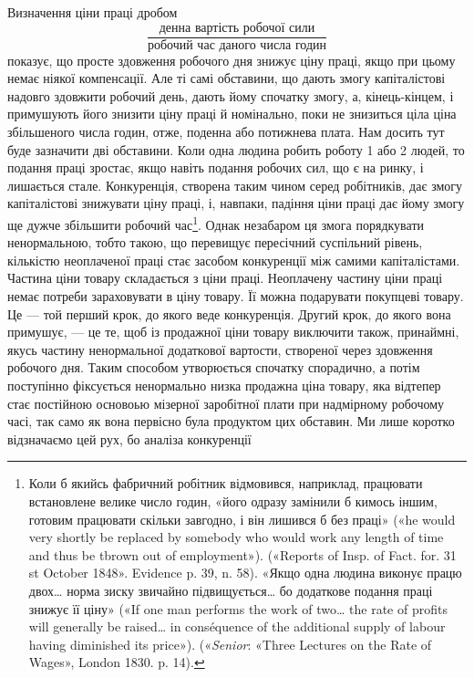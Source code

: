 Визначення ціни праці дробом\[
\frac{\text{денна вартість робочої сили}}{\text{робочий час даного числа годин}}
\]
\noindent{}показує, що просте здовження робочого дня знижує ціну праці,
якщо при цьому немає ніякої компенсації. Але ті самі обставини,
що дають змогу капіталістові надовго здовжити робочий день,
дають йому спочатку змогу, а, кінець-кінцем, і примушують
його знизити ціну праці й номінально, поки не знизиться ціла ціна
збільшеного числа годин, отже, поденна або потижнева плата.
Нам досить тут буде зазначити дві обставини. Коли одна людина
робить роботу 1 або 2 людей, то подання праці зростає, якщо
навіть подання робочих сил, що є на ринку, і лишається стале.
Конкуренція, створена таким чином серед робітників, дає змогу
капіталістові знижувати ціну праці, і, навпаки, падіння ціни
праці дає йому змогу ще дужче збільшити робочий час\footnote{
Коли б якийсь фабричний робітник відмовився, наприклад, працювати
встановлене велике число годин, «його одразу замінили б кимось
іншим, готовим працювати скільки завгодно, і він лишився б без праці»
(«he would very shortly be replaced by somebody who would work any
length of time and thus be tbrown out of employment»). («Reports of Insp.
of Fact. for. 31 st October 1848». Evidence p. 39, n. 58). «Якщо одна людина
виконує працю двох\dots{} норма зиску звичайно підвищується\dots{} бо додаткове
подання праці знижує її ціну» («If one man performs the work of
two\dots{} the rate of profits will generally be raised\dots{} in conséquence of the
additional supply of labour having diminished its price»). («\emph{Senior}:
«Three Lectures on the Rate of Wages», London 1830. p. 14).
}. Однак
незабаром ця змога порядкувати ненормальною, тобто такою,
що перевищує пересічний суспільний рівень, кількістю неоплаченої
праці стає засобом конкуренції між самими капіталістами.
Частина ціни товару складається з ціни праці. Неоплачену частину
ціни праці немає потреби зараховувати в ціну товару.
Її можна подарувати покупцеві товару. Це — той перший крок,
до якого веде конкуренція. Другий крок, до якого вона примушує,
— це те, щоб із продажної ціни товару виключити також,
принаймні, якусь частину ненормальної додаткової вартости, створеної
через здовження робочого дня. Таким способом утворюється
спочатку спорадично, а потім поступінно фіксується ненормально
низка продажна ціна товару, яка відтепер стає постійною
основоью мізерної заробітної плати при надмірному
робочому часі, так само як вона первісно була продуктом цих
обставин. Ми лише коротко відзначаємо цей рух, бо аналіза конкуренції
